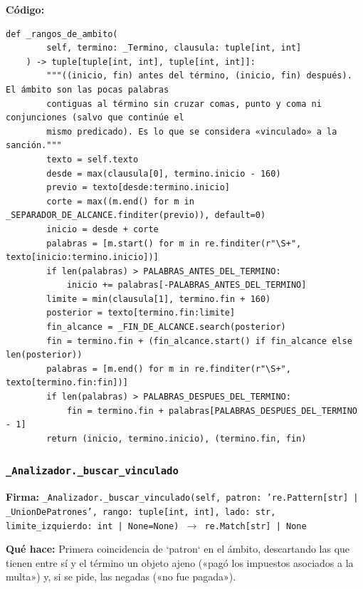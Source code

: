 \documentclass[11pt,a4paper]{article}
\begin{document}
\textbf{Código:}
\begin{lstlisting}
def _rangos_de_ambito(
        self, termino: _Termino, clausula: tuple[int, int]
    ) -> tuple[tuple[int, int], tuple[int, int]]:
        """((inicio, fin) antes del término, (inicio, fin) después). El ámbito son las pocas palabras
        contiguas al término sin cruzar comas, punto y coma ni conjunciones (salvo que continúe el
        mismo predicado). Es lo que se considera «vinculado» a la sanción."""
        texto = self.texto
        desde = max(clausula[0], termino.inicio - 160)
        previo = texto[desde:termino.inicio]
        corte = max((m.end() for m in _SEPARADOR_DE_ALCANCE.finditer(previo)), default=0)
        inicio = desde + corte
        palabras = [m.start() for m in re.finditer(r"\S+", texto[inicio:termino.inicio])]
        if len(palabras) > PALABRAS_ANTES_DEL_TERMINO:
            inicio += palabras[-PALABRAS_ANTES_DEL_TERMINO]
        limite = min(clausula[1], termino.fin + 160)
        posterior = texto[termino.fin:limite]
        fin_alcance = _FIN_DE_ALCANCE.search(posterior)
        fin = termino.fin + (fin_alcance.start() if fin_alcance else len(posterior))
        palabras = [m.end() for m in re.finditer(r"\S+", texto[termino.fin:fin])]
        if len(palabras) > PALABRAS_DESPUES_DEL_TERMINO:
            fin = termino.fin + palabras[PALABRAS_DESPUES_DEL_TERMINO - 1]
        return (inicio, termino.inicio), (termino.fin, fin)
\end{lstlisting}

\subsubsection*{\texttt{\_Analizador.\_buscar\_vinculado}}
\textbf{Firma:} \texttt{\_Analizador.\_buscar\_vinculado(self, patron: 're.Pattern[str] | \_UnionDePatrones', rango: tuple[int, int], lado: str, limite\_izquierdo: int | None=None) $\rightarrow$ re.Match[str] | None}

\textbf{Qué hace:} Primera coincidencia de `patron` en el ámbito, descartando las que tienen entre sí y el
término un objeto ajeno («pagó los impuestos asociados a la multa») y, si se pide, las
negadas («no fue pagada»).
\end{document}

